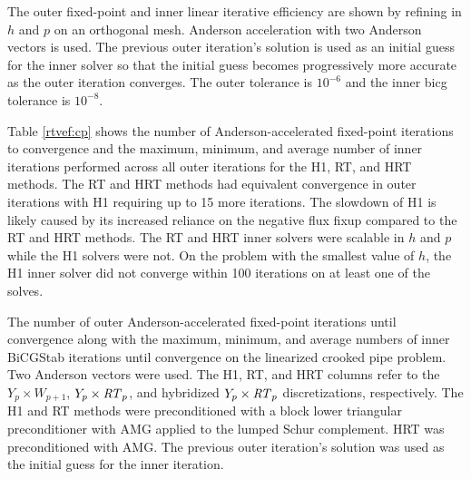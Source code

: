 \documentclass[../doc.tex]{subfiles}
\begin{document}
The outer fixed-point and inner linear iterative efficiency are shown by refining in $h$ and $p$ on an orthogonal mesh. Anderson acceleration with two Anderson vectors is used. The previous outer iteration's solution is used as an initial guess for the inner solver so that the initial guess becomes progressively more accurate as the outer iteration converges. The outer tolerance is $10^{-6}$ and the inner \gls{bicg} tolerance is $10^{-8}$. 

Table \ref{rtvef:cp} shows the number of Anderson-accelerated fixed-point iterations to convergence and the maximum, minimum, and average number of inner iterations performed across all outer iterations for the H1, RT, and HRT methods. The RT and HRT methods had equivalent convergence in outer iterations with H1 requiring up to 15 more iterations. The slowdown of H1 is likely caused by its increased reliance on the negative flux fixup compared to the RT and HRT methods. The RT and HRT inner solvers were scalable in $h$ and $p$ while the H1 solvers were not. On the problem with the smallest value of $h$, the H1 inner solver did not converge within 100 iterations on at least one of the solves. 
\begin{table}
\centering
\caption{The number of outer Anderson-accelerated fixed-point iterations until convergence along with the maximum, minimum, and average numbers of inner BiCGStab iterations until convergence on the linearized crooked pipe problem. Two Anderson vectors were used. The H1, RT, and HRT columns refer to the $Y_p\times W_{p+1}$, $Y_p\times \mathit{RT}_p$, and hybridized $Y_p\times \mathit{RT}_p$ discretizations, respectively. The H1 and RT methods were preconditioned with a block lower triangular preconditioner with AMG applied to the lumped Schur complement. HRT was preconditioned with AMG. The previous outer iteration's solution was used as the initial guess for the inner iteration. }
\label{rtvef:cp}
\begin{adjustbox}{max width=\textwidth}

\end{adjustbox}
\end{table}
\end{document}
